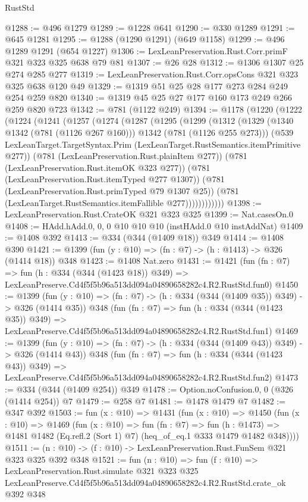 \begin{lexlean}{RustStd}
\begin{coremodule}
@1288 := @496 @1279
@1289 := @1228 @641
@1290 := @330 @1289
@1291 := @645 @1281
@1295 := @1288 (@1290 @1291) (@649 @1158)
@1299 := @496 @1289 @1291 (@654 @1227)
@1306 := LexLeanPreservation.Rust.Corr.primF @321 @323 @325 @638 @79 @81
@1307 := @26 @28
@1312 := @1306 @1307 @25 @274 @285 @277
@1319 := LexLeanPreservation.Rust.Corr.opsCons @321 @323 @325 @638 @120 @49
@1329 := @1319 @51 @25 @28 @177 @273 @284 @249 @254 @259 @820
@1340 := @1319 @45 @25 @27 @177 @160 @173 @249 @266 @259 @820 @723
@1342 := @781 (@1122 @249)
@1394 := @1178
    (@1220
      (@1222
        (@1224
          (@1241
            (@1257
              (@1274
                (@1287
                  (@1295
                    (@1299
                      (@1312
                        (@1329
                          (@1340 @1342 (@781 (@1126 @267 @160)))
                          @1342
                          (@781 (@1126 @255 @273)))
                        (@539
                          LexLeanTarget.TargetSyntax.Prim
                          (LexLeanTarget.RustSemantics.itemPrimitive @277))
                        (@781 (LexLeanPreservation.Rust.plainItem @277))
                        (@781 (LexLeanPreservation.Rust.itemOK @323 @277))
                        (@781 (LexLeanPreservation.Rust.itemTyped @277 @1307))
                        (@781 (LexLeanPreservation.Rust.primTyped @79 @1307 @25))
                        (@781 (LexLeanTarget.RustSemantics.itemFallible @277))))))))))))
@1398 := LexLeanPreservation.Rust.CrateOK @321 @323 @325
@1399 := Nat.casesOn.{0}
@1408 := HAdd.hAdd.{0, 0, 0} @10 @10 @10 (instHAdd.{0} @10 instAddNat)
@1409 := @1408 @392
@1413 := @334 (@344 (@1409 @18)) @349
@1414 := @1408 @390
@1421 := @1399 (fun (y : @10) => (fn : @7) -> (h : @1413) -> @326 (@1414 @18)) @348
@1423 := @1408 Nat.zero
@1431 := @1421
    (fun (fn : @7) =>
    fun (h : @334 (@344 (@1423 @18)) @349) =>
    LexLeanPreserve.Cd4f5f5b96a513dd094a04890658282c4.R2.RustStd.fun0)
@1450 := @1399
    (fun (y : @10) => (fn : @7) -> (h : @334 (@344 (@1409 @35)) @349) -> @326 (@1414 @35))
    @348
    (fun (fn : @7) =>
    fun (h : @334 (@344 (@1423 @35)) @349) =>
    LexLeanPreserve.Cd4f5f5b96a513dd094a04890658282c4.R2.RustStd.fun1)
@1469 := @1399
    (fun (y : @10) => (fn : @7) -> (h : @334 (@344 (@1409 @43)) @349) -> @326 (@1414 @43))
    @348
    (fun (fn : @7) =>
    fun (h : @334 (@344 (@1423 @43)) @349) =>
    LexLeanPreserve.Cd4f5f5b96a513dd094a04890658282c4.R2.RustStd.fun2)
@1473 := @334 (@344 (@1409 @254)) @349
@1478 := Option.noConfusion.{0, 0} (@326 (@1414 @254)) @7
@1479 := @258 @7
@1481 := @1478 @1479 @7
@1482 := @347 @392
@1503 := fun (x : @10) =>
  @1431
    (fun (x : @10) =>
    @1450
      (fun (x : @10) =>
      @1469
        (fun (x : @10) =>
        fun (fn : @7) =>
        fun (h : @1473) =>
        @1481 @1482 (Eq.refl.{2} (Sort 1) @7) (heq_of_eq.{1} @333 @1479 @1482 @348))))
@1511 := (n : @10) -> (f : @10) -> LexLeanPreservation.Rust.FunSem @321 @323 @325 @392 @348
@1521 := fun (n : @10) =>
  fun (f : @10) =>
  LexLeanPreservation.Rust.simulate
    @321
    @323
    @325
    LexLeanPreserve.Cd4f5f5b96a513dd094a04890658282c4.R2.RustStd.crate_ok
    @392
    @348
\end{coremodule}
\end{lexlean}
